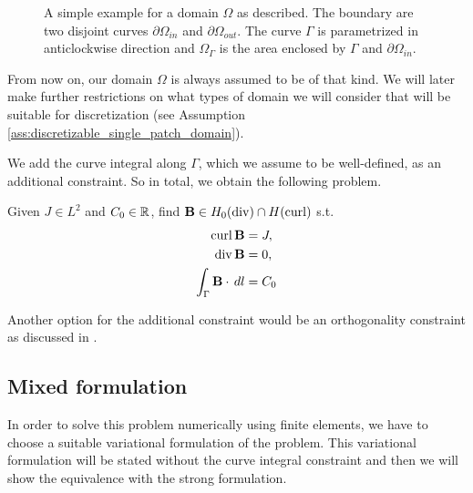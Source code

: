 \documentclass[../master_thesis.tex]{subfiles}
\begin{document}
\begin{figure}
    \centering
\caption{A simple example for a domain $\Omega$ as described. The boundary are two 
disjoint curves $\partial \Omega_{in}$ and $\partial \Omega_{out}$. The curve 
$\Gamma$ is parametrized in anticlockwise direction and $\Omega_\Gamma$ is the 
area enclosed by $\Gamma$ and $\partial \Omega_{in}$.} \label{fig:annulus_domain}
\end{figure}

From now on, our domain $\Omega$ is always assumed to be of that kind. We will 
later make further restrictions on what types of domain we will consider that 
will be suitable for discretization (see Assumption\,\ref{ass:discretizable_single_patch_domain}).


We add the curve integral along $\Gamma$, which we 
assume to be well-defined, as an additional constraint.
So in total, we obtain the following problem.
\begin{problem}\label{prob:2d_magnetostatic_problem}
    Given $J \in L^2$ and $C_0 \in \mathbb{R}$, find $\mathbf{B} \in H_0(\operatorname{div}) \cap H(\operatorname{curl})$ s.t.
    \begin{align*}
        \operatorname{curl} \mathbf{B} &= J, 
        \\ \operatorname{div} \mathbf{B} &= 0,
        \\ \int_\Gamma \mathbf{B} \cdot \, dl &= C_0
    \end{align*}
\end{problem}

Another option for the additional constraint would be an orthogonality constraint as discussed 
in \cite[Sec.\,3.5]{multipatch_paper}.

\subsection{Mixed formulation}
In order to solve this problem numerically using finite elements, we have to 
choose a suitable variational formulation of the problem. This variational formulation 
will be stated without the curve integral constraint and then we will show 
the equivalence with the strong formulation.
\end{document}
